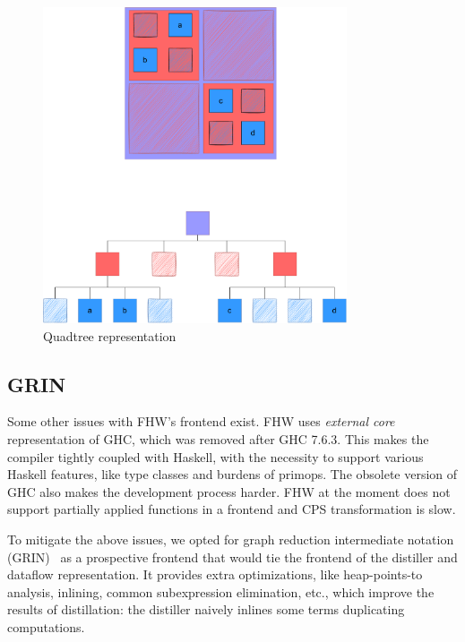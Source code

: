 \begin{figure}
    \centering
    \includegraphics[width=0.8\textwidth]{figures/qtree.drawio.pdf}
    \caption{Quadtree representation}
    \label{fig:qtree}
\end{figure}

\subsection{GRIN}

Some other issues with FHW's frontend exist. FHW uses \textit{external core} representation of GHC, which was removed after GHC 7.6.3. This makes the compiler tightly coupled with Haskell, with the necessity to support various Haskell features, like type classes and burdens of primops. The obsolete version of GHC also makes the development process harder. FHW at the moment does not support partially applied functions in a frontend and CPS transformation is slow.

To mitigate the above issues, we opted for graph reduction intermediate notation  (GRIN)~\cite{GRIN} as a prospective frontend that would tie the frontend of the distiller and dataflow representation. It provides extra optimizations, like heap-points-to analysis, inlining, common subexpression elimination, etc., which improve the results of distillation: the distiller naively inlines some terms duplicating computations. 

